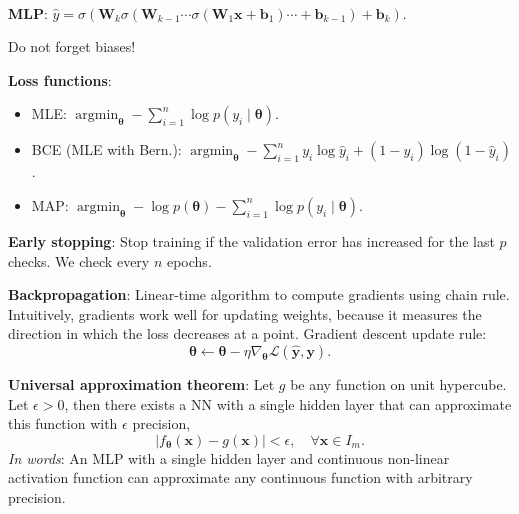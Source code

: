 \documentclass{article}
\DeclareMathOperator*{\argmin}{argmin}
\renewcommand{\vec}[1]{\bm{#1}}
\newcommand{\mat}[1]{\bm{#1}}
\newenvironment{topic}[1]
{\textbf{\sffamily \colorbox{black}{\rlap{\textbf{\textcolor{white}{#1}}}\hspace{\linewidth}\hspace{-2\fboxsep}}} \\ \vspace{0.2cm}}
{}
\begin{document}
\begin{multicols*}{2}
\begin{topic}{Neural networks}
        \textbf{MLP}: $\hat{y} = \sigma (\mat{W}_k \sigma( \mat{W}_{k-1} \cdots \sigma( \mat{W}_1 \vec{x} + \vec{b}_1 ) \cdots + \vec{b}_{k-1} ) + \vec{b}_k )$.

        Do not forget biases!

        \textbf{Loss functions}:
        \begin{itemize}
            \item MLE: $\argmin_{\vec{\theta}} - \sum_{i=1}^{n} \log p(y_i \mid \vec{\theta})$.
            \item BCE (MLE with Bern.): $\argmin_{\vec{\theta}} - \sum_{i=1}^{n} y_i \log \hat{y}_i + (1-y_i) \log (1
                      - \hat{y}_i)$.
            \item MAP: $\argmin_{\vec{\theta}} - \log p(\vec{\theta}) - \sum_{i=1}^{n} \log p(y_i \mid
                      \vec{\theta})$.
        \end{itemize}

        \textbf{Early stopping}: Stop training if the validation error has increased for the last
        $p$ checks. We check every $n$ epochs.

        \textbf{Backpropagation}: Linear-time algorithm to compute gradients using chain rule.
        Intuitively, gradients work well for updating weights, because it measures the direction in
        which the loss decreases at a point. Gradient descent update rule: \[
            \vec{\theta} \gets \vec{\theta} - \eta \nabla_{\vec{\theta}} \mathcal{L}(\hat{\vec{y}}, \vec{y}).
        \]

        \textbf{Universal approximation theorem}: Let $g$ be any function on unit hypercube. Let
        $\epsilon > 0$, then there exists a NN with a single hidden layer that can
        approximate this function with $\epsilon$ precision, \[
            | f_{\vec{\theta}}(\vec{x}) - g(\vec{x}) | < \epsilon, \quad \forall \vec{x} \in I_m.
        \]
        \textit{In words}: An MLP with a single hidden layer and continuous non-linear activation function can
        approximate any continuous function with arbitrary precision.

    \end{topic}

    \begin{topic}{Convolutional neural networks}


\end{topic}
\end{multicols*}
\end{document}
